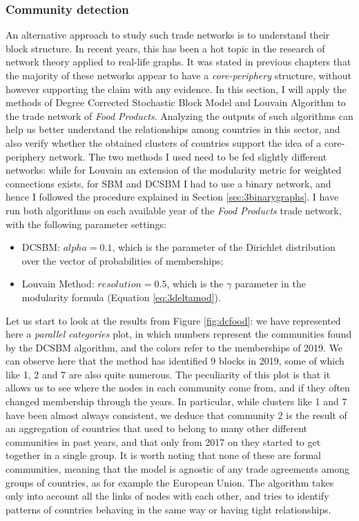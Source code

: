 \subsubsection*{Community detection}

An alternative approach to study such trade networks is to understand their block structure. In recent years, this has been a hot topic in the research of network theory applied to real-life graphs. It was stated in previous chapters that the majority of these networks appear to have a \textit{core-periphery} structure, without however supporting the claim with any evidence. In this section, I will apply the methods of Degree Corrected Stochastic Block Model and Louvain Algorithm to the trade network of \textit{Food Products}. Analyzing the outputs of such algorithms can help us better understand the relationships among countries in this sector, and also verify whether the obtained clusters of countries support the idea of a core-periphery network. The two methods I used need to be fed slightly different networks: while for Louvain an extension of the modularity metric for weighted connections exists, for SBM and DCSBM I had to use a binary network, and hence I followed the procedure explained in Section \ref{sec:3binarygraphs}. I have run both algorithms on each available year of the \textit{Food Products} trade network, with the following parameter settings:
\begin{itemize}
    \item DCSBM: $alpha = 0.1$, which is the parameter of the Dirichlet distribution over the vector of probabilities of memberships;
    \item Louvain Method: $resolution = 0.5$, which is the $\gamma$ parameter in the modularity formula (Equation \ref{eq:3deltamod}).
\end{itemize}
Let us start to look at the results from Figure \ref{fig:dcfood}: we have represented here a \textit{parallel categories} plot, in which numbers represent the communities found by the DCSBM algorithm, and the colors refer to the memberships of 2019. We can observe here that the method has identified 9 blocks in 2019, some of which like 1, 2 and 7 are also quite numerous. The peculiarity of this plot is that it allows us to see where the nodes in each community come from, and if they often changed membership through the years. In particular, while clusters like 1 and 7 have been almost always consistent, we deduce that community 2 is the result of an aggregation of countries that used to belong to many other different communities in past years, and that only from 2017 on they started to get together in a single group. It is worth noting that none of these are formal communities, meaning that the model is agnostic of any trade agreements among groups of countries, as for example the European Union. The algorithm takes only into account all the links of nodes with each other, and tries to identify patterns of countries behaving in the same way or having tight relationships.
